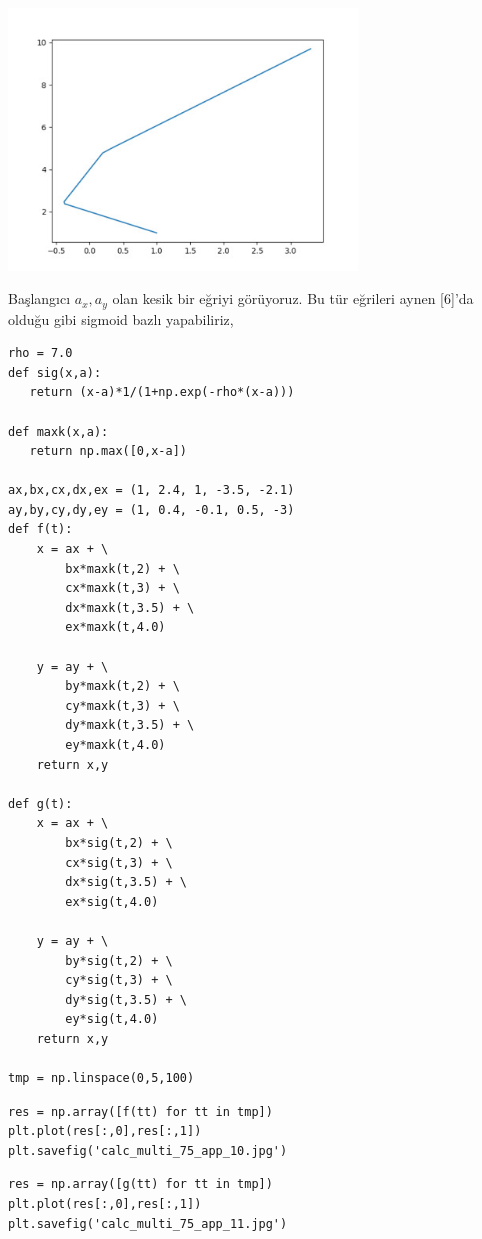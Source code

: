 \documentclass[12pt,fleqn]{article}\usepackage{../../common}
\begin{document}
\includegraphics[width=25em]{calc_multi_75_app_09.jpg}

Başlangıcı $a_x,a_y$ olan kesik bir eğriyi görüyoruz. Bu tür eğrileri aynen
[6]'da olduğu gibi sigmoid bazlı yapabiliriz,

\begin{verbatim}
rho = 7.0
def sig(x,a):
   return (x-a)*1/(1+np.exp(-rho*(x-a)))

def maxk(x,a):
   return np.max([0,x-a])

ax,bx,cx,dx,ex = (1, 2.4, 1, -3.5, -2.1)
ay,by,cy,dy,ey = (1, 0.4, -0.1, 0.5, -3)
def f(t):
    x = ax + \
        bx*maxk(t,2) + \
        cx*maxk(t,3) + \
        dx*maxk(t,3.5) + \
        ex*maxk(t,4.0)
	   
    y = ay + \
        by*maxk(t,2) + \
        cy*maxk(t,3) + \
        dy*maxk(t,3.5) + \
        ey*maxk(t,4.0)
    return x,y	   
    
def g(t):
    x = ax + \
        bx*sig(t,2) + \
        cx*sig(t,3) + \
        dx*sig(t,3.5) + \
        ex*sig(t,4.0)
	   
    y = ay + \
        by*sig(t,2) + \
        cy*sig(t,3) + \
        dy*sig(t,3.5) + \
        ey*sig(t,4.0)
    return x,y	   
    
tmp = np.linspace(0,5,100)
\end{verbatim}

\begin{verbatim}
res = np.array([f(tt) for tt in tmp])
plt.plot(res[:,0],res[:,1])
plt.savefig('calc_multi_75_app_10.jpg')
\end{verbatim}

\begin{verbatim}
res = np.array([g(tt) for tt in tmp])
plt.plot(res[:,0],res[:,1])
plt.savefig('calc_multi_75_app_11.jpg')
\end{verbatim}
\end{document}
